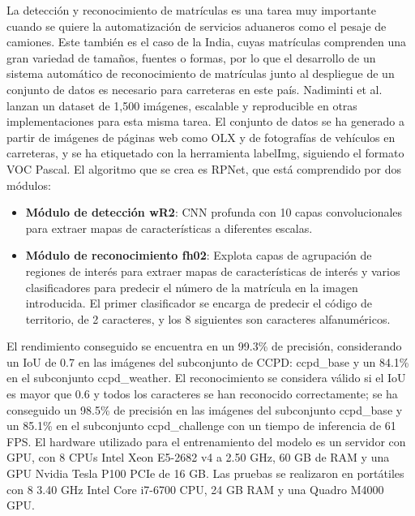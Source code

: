 \documentclass[12pt,a4paper,onecolumn,oneside]{report}
\begin{document}
La detección y reconocimiento de matrículas es una tarea muy importante cuando se quiere la automatización de servicios aduaneros como el pesaje de camiones. Este también es el caso de la India, cuyas matrículas comprenden una gran variedad de tamaños, fuentes o formas, por lo que el desarrollo de un sistema automático de reconocimiento de matrículas junto al despliegue de un conjunto de datos es necesario para carreteras en este país. Nadiminti et al. \cite{nadiminti2022explorationendtoendautomaticnumberplate} lanzan un dataset de 1,500 imágenes, escalable y reproducible en otras implementaciones para esta misma tarea. El conjunto de datos se ha generado a partir de imágenes de páginas web como OLX y de fotografías de vehículos en carreteras, y se ha etiquetado con la herramienta labelImg, siguiendo el formato VOC Pascal. El algoritmo que se crea es RPNet, que está comprendido por dos módulos:
\begin{itemize}
    \item \textbf{Módulo de detección wR2}: CNN profunda con 10 capas convolucionales para extraer mapas de características a diferentes escalas.
    \item \textbf{Módulo de reconocimiento fh02}: Explota capas de agrupación de regiones de interés para extraer mapas de características de interés y varios clasificadores para predecir el número de la matrícula en la imagen introducida. El primer clasificador se encarga de predecir el código de territorio, de 2 caracteres, y los 8 siguientes son caracteres alfanuméricos.
\end{itemize}

El rendimiento conseguido se encuentra en un 99.3\% de precisión, considerando un IoU de 0.7 en las imágenes del subconjunto de CCPD: ccpd\_base y un 84.1\% en el subconjunto ccpd\_weather. El reconocimiento se considera válido si el IoU es mayor que 0.6 y todos los caracteres se han reconocido correctamente; se ha conseguido un 98.5\% de precisión en las imágenes del subconjunto ccpd\_base y un 85.1\% en el subconjunto ccpd\_challenge con un tiempo de inferencia de 61 FPS. El hardware utilizado para el entrenamiento del modelo es un servidor con GPU, con 8 CPUs Intel Xeon E5-2682 v4 a 2.50 GHz, 60 GB de RAM y una GPU Nvidia Tesla P100 PCIe de 16 GB. Las pruebas se realizaron en portátiles con 8 3.40 GHz Intel Core i7-6700 CPU, 24 GB RAM y una Quadro M4000 GPU. 
\end{document}

